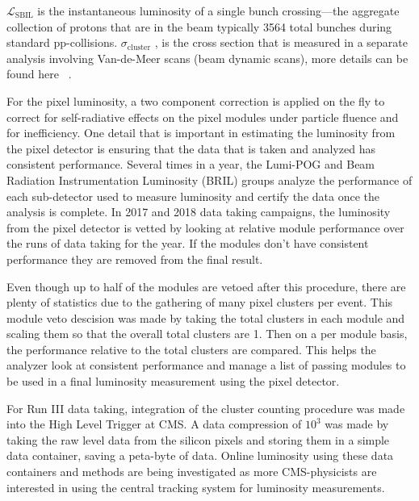 $\mathcal{L}_{\text{SBIL}}$ is the instantaneous luminosity of a single bunch crossing---the aggregate collection of protons that are in the beam typically 3564 total bunches during standard pp-collisions. $\sigma_{\text{cluster}}$ , is the cross section that is measured in a separate analysis involving Van-de-Meer scans (beam dynamic scans), more details can be found here ~\cite{Knolle:2792593}. 



For the pixel luminosity, a two component correction is applied on the fly to correct for self-radiative effects on the pixel modules under particle fluence and for inefficiency.  
One detail that is important in estimating the luminosity from the pixel detector is ensuring that the data that is taken and analyzed has consistent performance. Several times in a year, the Lumi-POG and Beam Radiation Instrumentation Luminosity (BRIL) groups analyze the performance of each sub-detector used to measure luminosity and certify the data once the analysis is complete. In 2017 and 2018 data taking campaigns, the luminosity from the pixel detector is vetted by looking at relative module performance over the runs of data taking for the year. If the modules don't have consistent performance they are removed from the final result. 

Even though up to half of the modules are vetoed after this procedure, there are plenty of statistics due to the gathering of many pixel clusters per event. 
This module veto descision was made by taking the total clusters in each module and scaling them so that the overall total clusters are 1. Then on a per module basis, the performance relative to the total clusters are compared. This helps the analyzer look at consistent performance and manage a list of passing modules to be used in a final luminosity measurement using the pixel detector. 

For Run III data taking, integration of the cluster counting procedure was made into the High Level Trigger at CMS. A data compression of $10^3$ was made by taking the raw level data from the silicon pixels and storing them in a simple data container, saving a peta-byte of data. Online luminosity using these data containers and methods are being investigated as more CMS-physicists are interested in using the central tracking system for luminosity measurements.





